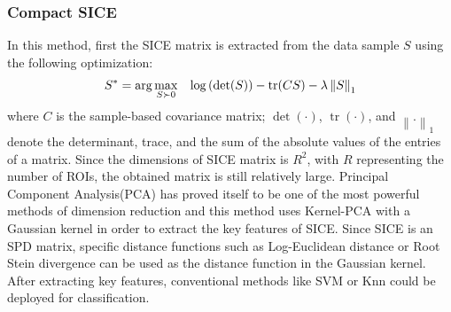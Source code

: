 \documentclass[journal]{IEEEtran}
\newcommand\norm[1]{\left\lVert#1\right\rVert}
\begin{document}
	\subsubsection{Compact SICE}
	In this method, first the SICE matrix is extracted from the data sample $S$ using the following optimization: 
	\begin{align}
	S^* = \operatorname{arg} \max\limits_{S\succ 0} \hspace{3mm} \log \left( \det(S) \right) - \operatorname{tr}(CS) - \lambda \norm{S}_1
	\end{align}
	where $C$ is the sample-based covariance matrix; $\det(·)$, $\operatorname{tr}(·)$,
	and $\norm{.}_1$ denote the determinant, trace, and the sum of the absolute values of the entries of a matrix. Since the dimensions of SICE matrix is $R^2$, with $R$ representing the number of ROIs, the obtained matrix is still relatively large. Principal Component Analysis(PCA) has proved itself to be one of the most powerful methods of dimension reduction and this method uses Kernel-PCA with a Gaussian kernel in order to extract the key features of SICE.
	Since SICE is an SPD matrix, specific distance functions such as Log-Euclidean distance or Root Stein divergence can be used as the distance function in the Gaussian kernel.
	After extracting key features, conventional methods like SVM or Knn could be deployed for classification.
	
\end{document}

